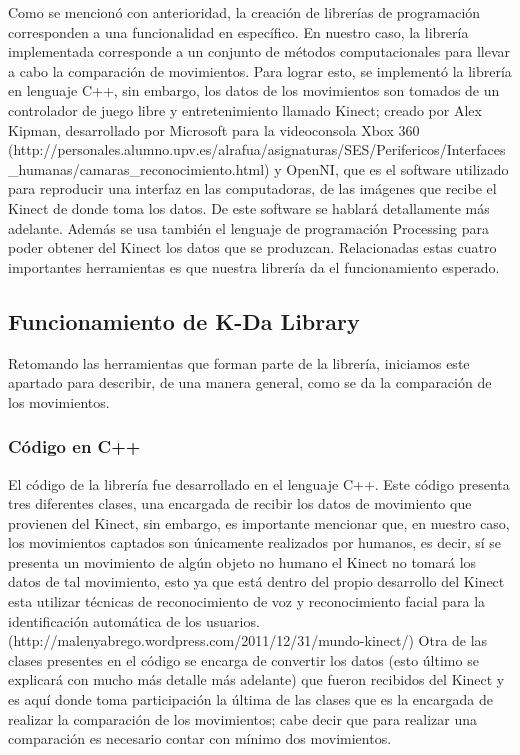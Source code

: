 \documentclass[letterpaper]{article}
\begin{document}
\quad \quad Como se mencionó con anterioridad, la creación de librerías de programación corresponden a una funcionalidad en específico. En nuestro caso, la librería
implementada corresponde a un conjunto de métodos computacionales para llevar a cabo la comparación de movimientos. Para lograr esto, se implementó 
la librería en lenguaje C++, sin embargo, los datos de los movimientos son tomados de un controlador de juego libre y entretenimiento llamado Kinect; creado por Alex Kipman, desarrollado por Microsoft para la videoconsola Xbox 360 (http://personales.alumno.upv.es/alrafua/asignaturas/SES/Perifericos/Interfaces\_humanas/camaras\_reconocimiento.html)
y OpenNI, que es el software utilizado para reproducir una interfaz en las computadoras, de las imágenes que recibe el Kinect de donde toma los datos. De este software se hablará detallamente más adelante. 
Además se usa también el lenguaje de programación Processing para poder obtener del Kinect los datos que se produzcan. Relacionadas estas cuatro importantes
herramientas es que nuestra librería da el funcionamiento esperado. 

\subsection{Funcionamiento de K-Da Library}

\quad \quad Retomando las herramientas que forman parte de la librería, iniciamos este apartado para describir, de una manera general, como se da la comparación de los movimientos.

\subsubsection{Código en C++}

\quad \quad El código de la librería fue desarrollado en el lenguaje C++. Este código presenta tres diferentes clases, una encargada de recibir los datos de movimiento que provienen del Kinect, sin embargo, es importante mencionar que, en nuestro caso, los movimientos captados son únicamente realizados por humanos, es decir, sí se presenta un movimiento de algún objeto no humano el Kinect no tomará los datos de tal movimiento,
esto ya que está dentro del propio desarrollo del Kinect esta utilizar técnicas de reconocimiento de voz y reconocimiento facial para la identificación automática de los usuarios. (http://malenyabrego.wordpress.com/2011/12/31/mundo-kinect/) Otra de las clases presentes en el código se encarga de convertir los datos (esto último se explicará con mucho más detalle más adelante) que fueron 
recibidos del Kinect y es aquí donde toma participación la última de las clases que es la encargada de realizar la comparación de los movimientos; cabe decir que para realizar una comparación es necesario contar con mínimo dos movimientos.
\end{document}
